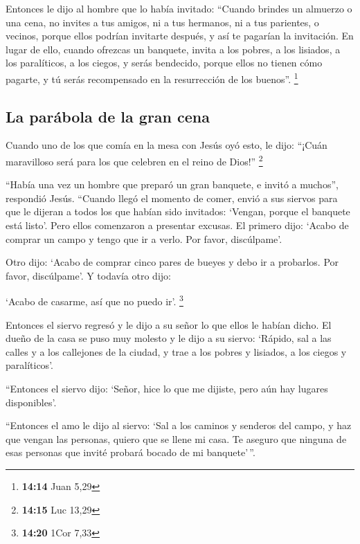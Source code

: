  Entonces le dijo al hombre que lo había invitado:
``Cuando brindes un almuerzo o una cena, no invites a tus amigos, ni a
tus hermanos, ni a tus parientes, o vecinos, porque ellos podrían
invitarte después, y así te pagarían la invitación.  En
lugar de ello, cuando ofrezcas un banquete, invita a los pobres, a los
lisiados, a los paralíticos, a los ciegos,  y serás
bendecido, porque ellos no tienen cómo pagarte, y tú serás recompensado
en la resurrección de los buenos''. \footnote{\textbf{14:14} Juan 5,29}

\hypertarget{la-paruxe1bola-de-la-gran-cena}{%
\subsection{La parábola de la gran
cena}\label{la-paruxe1bola-de-la-gran-cena}}

 Cuando uno de los que comía en la mesa con Jesús oyó
esto, le dijo: ``¡Cuán maravilloso será para los que celebren en el
reino de Dios!'' \footnote{\textbf{14:15} Luc 13,29}

 ``Había una vez un hombre que preparó un gran banquete,
e invitó a muchos'', respondió Jesús.  ``Cuando llegó el
momento de comer, envió a sus siervos para que le dijeran a todos los
que habían sido invitados: `Vengan, porque el banquete está listo'.
 Pero ellos comenzaron a presentar excusas. El primero
dijo: `Acabo de comprar un campo y tengo que ir a verlo. Por favor,
discúlpame'.

 Otro dijo: `Acabo de comprar cinco pares de bueyes y
debo ir a probarlos. Por favor, discúlpame'. Y todavía otro dijo:

 `Acabo de casarme, así que no puedo ir'. \footnote{\textbf{14:20}
  1Cor 7,33}

 Entonces el siervo regresó y le dijo a su señor lo que
ellos le habían dicho. El dueño de la casa se puso muy molesto y le dijo
a su siervo: `Rápido, sal a las calles y a los callejones de la ciudad,
y trae a los pobres y lisiados, a los ciegos y paralíticos'.

 ``Entonces el siervo dijo: `Señor, hice lo que me
dijiste, pero aún hay lugares disponibles'.

 ``Entonces el amo le dijo al siervo: `Sal a los caminos
y senderos del campo, y haz que vengan las personas, quiero que se llene
mi casa.  Te aseguro que ninguna de esas personas que
invité probará bocado de mi banquete'\,''.

